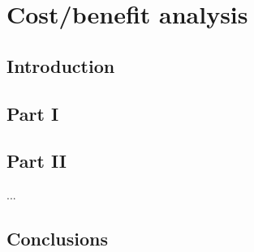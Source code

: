 \chapter{Cost/benefit analysis }

\section{Introduction}

\section{Part I}\label{Part I}  %


\section{Part II}\label{Part II} %

...

\section{Conclusions}\label{conclusions}